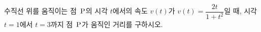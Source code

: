 수직선 위를 움직이는 점~$\mathrm{P}$의 시각 $t$에서의 속도 $v(t)$가 $v(t)=\dfrac{2t}{1+t^2}$일 때, 시각 $t=1$에서 $t=3$까지 점~$\mathrm{P}$가 움직인 거리를 구하시오.
